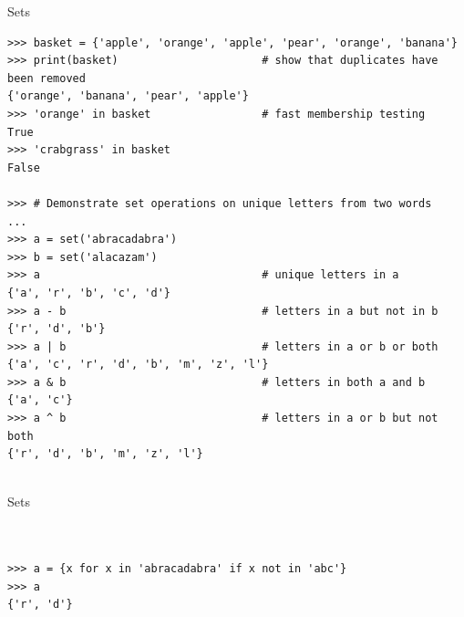 \documentclass{beamer}
\begin{document}
\begin{frame}[t,fragile]{Sets}
    \scriptsize
\begin{verbatim}
>>> basket = {'apple', 'orange', 'apple', 'pear', 'orange', 'banana'}
>>> print(basket)                      # show that duplicates have been removed
{'orange', 'banana', 'pear', 'apple'}
>>> 'orange' in basket                 # fast membership testing
True
>>> 'crabgrass' in basket
False

>>> # Demonstrate set operations on unique letters from two words
...
>>> a = set('abracadabra')
>>> b = set('alacazam')
>>> a                                  # unique letters in a
{'a', 'r', 'b', 'c', 'd'}
>>> a - b                              # letters in a but not in b
{'r', 'd', 'b'}
>>> a | b                              # letters in a or b or both
{'a', 'c', 'r', 'd', 'b', 'm', 'z', 'l'}
>>> a & b                              # letters in both a and b
{'a', 'c'}
>>> a ^ b                              # letters in a or b but not both
{'r', 'd', 'b', 'm', 'z', 'l'}


\end{verbatim}
\end{frame}


\begin{frame}[t,fragile]{Sets}


\begin{verbatim}


>>> a = {x for x in 'abracadabra' if x not in 'abc'}
>>> a
{'r', 'd'}


\end{verbatim}


\end{frame}
\end{document}
